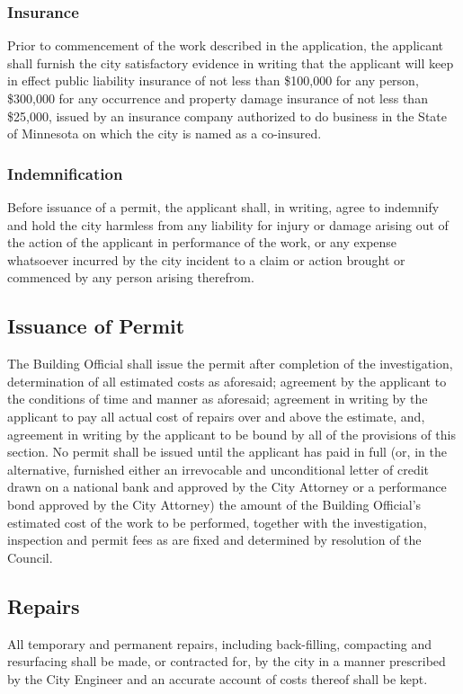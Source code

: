 \subsubsection{Insurance}
Prior to commencement of the work described in the application, the applicant shall furnish the city satisfactory evidence in writing that the applicant will keep in effect public liability insurance of not less than \$100,000 for any person, \$300,000 for any occurrence and property damage insurance of not less than \$25,000, issued by an insurance company authorized to do business in the State of Minnesota on which the city is named as a co-insured.
\subsubsection{Indemnification}
Before issuance of a permit, the applicant shall, in writing, agree to indemnify and hold the city harmless from any liability for injury or damage arising out of the action of the applicant in performance of the work, or any expense whatsoever incurred by the city incident to a claim or action brought or commenced by any person arising therefrom.
\subsection{Issuance of Permit}
The Building Official shall issue the permit after completion of the investigation, determination of all estimated costs as aforesaid; agreement by the applicant to the conditions of time and manner as aforesaid; agreement in writing by the applicant to pay all actual cost of repairs over and above the estimate, and, agreement in writing by the applicant to be bound by all of the provisions of this section.  No permit shall be issued until the applicant has paid in full (or, in the alternative, furnished either an irrevocable and unconditional letter of credit drawn on a national bank and approved by the City Attorney or a performance bond approved by the City Attorney) the amount of the Building Official’s estimated cost of the work to be performed, together with the investigation, inspection and permit fees as are fixed and determined by resolution of the Council.
\subsection{Repairs}
All temporary and permanent repairs, including back-filling, compacting and resurfacing shall be made, or contracted for, by the city in a manner prescribed by the City Engineer and an accurate account of costs thereof shall be kept.
